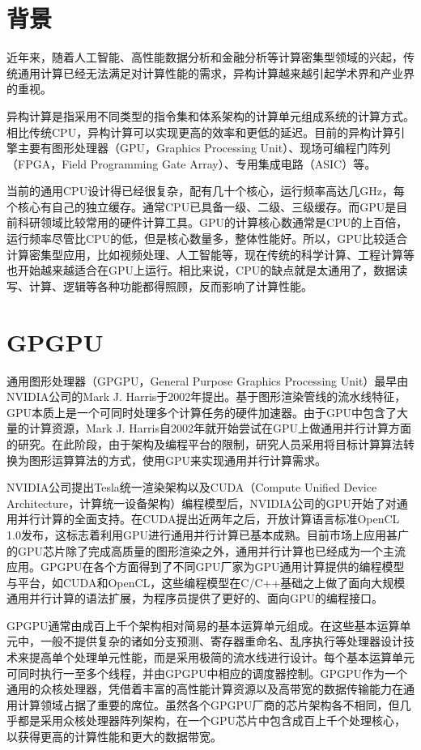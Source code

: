 \documentclass[a4paper,12pt,english]{sphinxmanual}
\begin{document}
\section{背景}
\label{\detokenize{gpu-computing/gpu-computing:id1}}
\sphinxAtStartPar
近年来，随着人工智能、高性能数据分析和金融分析等计算密集型领域的兴起，传统通用计算已经无法满足对计算性能的需求，异构计算越来越引起学术界和产业界的重视。

\sphinxAtStartPar
异构计算是指采用不同类型的指令集和体系架构的计算单元组成系统的计算方式。相比传统CPU，异构计算可以实现更高的效率和更低的延迟。目前的异构计算引擎主要有图形处理器（GPU，Graphics Processing Unit）、现场可编程门阵列（FPGA，Field Programming Gate Array）、专用集成电路（ASIC）等。

\sphinxAtStartPar
当前的通用CPU设计得已经很复杂，配有几十个核心，运行频率高达几GHz，每个核心有自己的独立缓存。通常CPU已具备一级、二级、三级缓存。而GPU是目前科研领域比较常用的硬件计算工具。GPU的计算核心数通常是CPU的上百倍，运行频率尽管比CPU的低，但是核心数量多，整体性能好。所以，GPU比较适合计算密集型应用，比如视频处理、人工智能等，现在传统的科学计算、工程计算等也开始越来越适合在GPU上运行。相比来说，CPU的缺点就是太通用了，数据读写、计算、逻辑等各种功能都得照顾，反而影响了计算性能。


\section{GPGPU}
\label{\detokenize{gpu-computing/gpu-computing:gpgpu}}
\sphinxAtStartPar
通用图形处理器（GPGPU，General Purpose Graphics Processing Unit）最早由NVIDIA公司的Mark J. Harris于2002年提出。基于图形渲染管线的流水线特征，GPU本质上是一个可同时处理多个计算任务的硬件加速器。由于GPU中包含了大量的计算资源，Mark J. Harris自2002年就开始尝试在GPU上做通用并行计算方面的研究。在此阶段，由于架构及编程平台的限制，研究人员采用将目标计算算法转换为图形运算算法的方式，使用GPU来实现通用并行计算需求。

\sphinxAtStartPar
NVIDIA公司提出Tesla统一渲染架构以及CUDA（Compute Unified Device Architecture，计算统一设备架构）编程模型后，NVIDIA公司的GPU开始了对通用并行计算的全面支持。在CUDA提出近两年之后，开放计算语言标准OpenCL 1.0发布，这标志着利用GPU进行通用并行计算已基本成熟。目前市场上应用甚广的GPU芯片除了完成高质量的图形渲染之外，通用并行计算也已经成为一个主流应用。GPGPU在各个方面得到了不同GPU厂家为GPU通用计算提供的编程模型与平台，如CUDA和OpenCL，这些编程模型在C/C++基础之上做了面向大规模通用并行计算的语法扩展，为程序员提供了更好的、面向GPU的编程接口。

\sphinxAtStartPar
GPGPU通常由成百上千个架构相对简易的基本运算单元组成。在这些基本运算单元中，一般不提供复杂的诸如分支预测、寄存器重命名、乱序执行等处理器设计技术来提高单个处理单元性能，而是采用极简的流水线进行设计。每个基本运算单元可同时执行一至多个线程，并由GPGPU中相应的调度器控制。GPGPU作为一个通用的众核处理器，凭借着丰富的高性能计算资源以及高带宽的数据传输能力在通用计算领域占据了重要的席位。虽然各个GPGPU厂商的芯片架构各不相同，但几乎都是采用众核处理器阵列架构，在一个GPU芯片中包含成百上千个处理核心，以获得更高的计算性能和更大的数据带宽。
\end{document}
